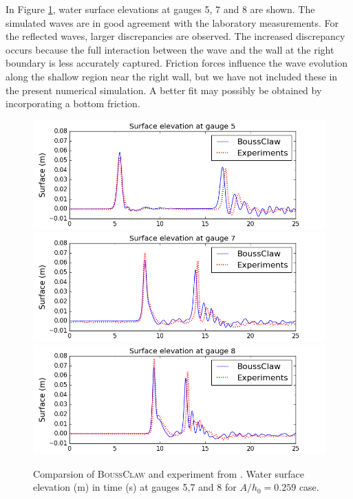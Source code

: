 \documentclass[review]{elsarticle}
\newcommand{\BoussClaw}{\textsc{BoussClaw} }
\begin{document}
In Figure \ref{fig:bp5b_gauges}, water surface elevations at gauges 5, 7 and 8 are shown. 
The simulated waves are in good agreement with the laboratory measurements. 
For the reflected waves, larger discrepancies are observed.
The increased discrepancy occurs because the full interaction between the wave and the wall
at the right boundary is less accurately captured.
Friction forces influence the wave evolution along the shallow region near the right wall,
but we have not included these in the present numerical simulation.
A better fit may possibly be obtained by incorporating a bottom friction.

\begin{figure}[!htb]
\centering
\includegraphics[width=.8\textwidth]{_fig/gauge0005fig300.png}\\
\includegraphics[width=.8\textwidth]{_fig/gauge0007fig300.png}\\
\includegraphics[width=.8\textwidth]{_fig/gauge0008fig300.png}
\caption{Comparsion of \BoussClaw and experiment from \cite{chl_bp5}. Water surface elevation (m) in time (s) at gauges 5,7 and 8 for $A/h_0=0.259$ case.}
\label{fig:bp5b_gauges}
\end{figure}

\end{document}
